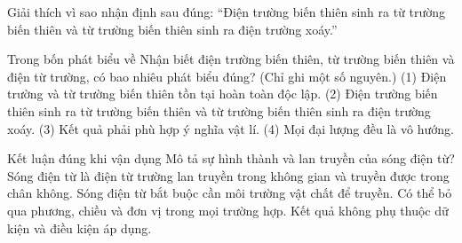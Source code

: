 \begin{bt}
Giải thích vì sao nhận định sau đúng: “Điện trường biến thiên sinh ra từ trường biến thiên và từ trường biến thiên sinh ra điện trường xoáy.”
\end{bt}

\begin{ex}
Trong bốn phát biểu về Nhận biết điện trường biến thiên, từ trường biến thiên và điện từ trường, có bao nhiêu phát biểu đúng? (Chỉ ghi một số nguyên.) (1) Điện trường và từ trường biến thiên tồn tại hoàn toàn độc lập. (2) Điện trường biến thiên sinh ra từ trường biến thiên và từ trường biến thiên sinh ra điện trường xoáy. (3) Kết quả phải phù hợp ý nghĩa vật lí. (4) Mọi đại lượng đều là vô hướng.
\end{ex}

\begin{ex}
Kết luận đúng khi vận dụng Mô tả sự hình thành và lan truyền của sóng điện từ?
\choice
{\True Sóng điện từ là điện từ trường lan truyền trong không gian và truyền được trong chân không.}
{Sóng điện từ bắt buộc cần môi trường vật chất để truyền.}
{Có thể bỏ qua phương, chiều và đơn vị trong mọi trường hợp.}
{Kết quả không phụ thuộc dữ kiện và điều kiện áp dụng.}
\end{ex}

